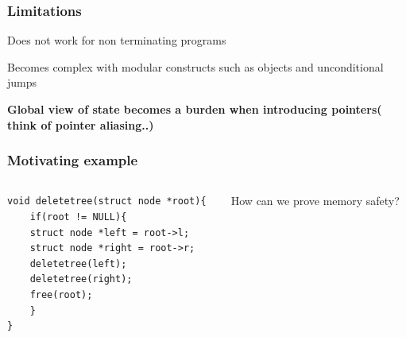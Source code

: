 \documentclass[professionalfont]{beamer}
\begin{document}
    \begin{frame}
        \frametitle{Limitations}
        
        Does not work for non terminating programs 
        \pause    
        \bigskip
        
        Becomes complex with modular constructs such as objects and unconditional jumps
        \pause
        \bigskip

        \textbf{Global view of state becomes a burden when introducing pointers( think of pointer aliasing..)}

        
    \end{frame}
\begin{frame}[fragile]
    \frametitle{Motivating example}
        \begin{columns}
    \begin{column}{0.7\textwidth}
    \begin{lstlisting}
void deletetree(struct node *root){
    if(root != NULL){
    struct node *left = root->l;
    struct node *right = root->r;
    deletetree(left);
    deletetree(right);
    free(root);
    }
}
    \end{lstlisting}
        \end{column}
            \begin{column}{0.3\textwidth}
                How can we prove memory safety?
            \end{column}
        \end{columns}
    \end{frame}
\end{document}
